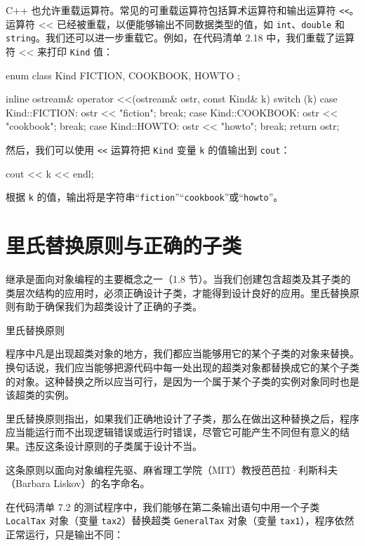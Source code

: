 C++ 也允许重载运算符。常见的可重载运算符包括算术运算符和输出运算符 \texttt{<<}。运算符 << 已经被重载，以便能够输出不同数据类型的值，如 \texttt{int}、\texttt{double} 和 \texttt{string}。我们还可以进一步重载它。例如，在代码清单 2.18 中，我们重载了运算符 << 来打印 \texttt{Kind} 值：

\begin{codebox}
enum class Kind
{
    FICTION, COOKBOOK, HOWTO
};

inline ostream& operator <<(ostream& ostr, const Kind& k)
{
    switch (k)
    {
        case Kind::FICTION:  ostr << "fiction";  break;
        case Kind::COOKBOOK: ostr << "cookbook"; break;
        case Kind::HOWTO:    ostr << "howto";    break;
    }
    return ostr;
}
\end{codebox}

然后，我们可以使用 \texttt{<<} 运算符把 \texttt{Kind} 变量 \texttt{k} 的值输出到 \texttt{cout}：

\begin{codebox}
cout << k << endl;
\end{codebox}

根据 \texttt{k} 的值，输出将是字符串“\texttt{fiction}”“\texttt{cookbook}”或“\texttt{howto}”。

\section{里氏替换原则与正确的子类}

继承是面向对象编程的主要概念之一（1.8 节）。当我们创建包含超类及其子类的类层次结构的应用时，必须正确设计子类，才能得到设计良好的应用。里氏替换原则有助于确保我们为超类设计了正确的子类。

\begin{mySidebar}{里氏替换原则}

程序中凡是出现超类对象的地方，我们都应当能够用它的某个子类的对象来替换。换句话说，我们应当能够把源代码中每一处出现的超类对象都替换成它的某个子类的对象。这种替换之所以应当可行，是因为一个属于某个子类的实例对象同时也是该超类的实例。

里氏替换原则指出，如果我们正确地设计了子类，那么在做出这种替换之后，程序应当能运行而不出现逻辑错误或运行时错误，尽管它可能产生不同但有意义的结果。违反这条设计原则的子类属于设计不当。

这条原则以面向对象编程先驱、麻省理工学院（MIT）教授芭芭拉·利斯科夫（Barbara Liskov）的名字命名。
\end{mySidebar}

在代码清单 7.2 的测试程序中，我们能够在第二条输出语句中用一个子类 \texttt{LocalTax} 对象（变量 \texttt{tax2}）替换超类 \texttt{General\allowbreak{}Tax} 对象（变量 \texttt{tax1}），程序依然正常运行，只是输出不同：

